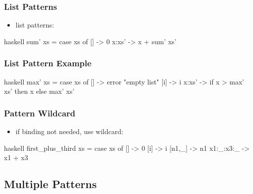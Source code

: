 \documentclass[dvipsnames]{beamer}
\theoremstyle{plain}
\begin{document}
\begin{frame}[fragile]
  \frametitle{List Patterns}

  \begin{itemize}
    \item list patterns:\\
  \end{itemize}

  \pause
  \begin{example}
    \begin{pygments}{haskell}
sum' xs =
    case xs of
      [] -> 0
      x:xs' -> x + sum' xs'
    \end{pygments}
  \end{example}
\end{frame}

\begin{frame}[fragile]
  \frametitle{List Pattern Example}

  \begin{example}
    \pause
    \begin{pygments}{haskell}
max' xs =
    case xs of
      [] -> error "empty list"
      [i] -> i
      x:xs' -> if x > max' xs' then x else max' xs'
    \end{pygments}
  \end{example}
\end{frame}

\begin{frame}[fragile]
  \frametitle{Pattern Wildcard}

  \begin{itemize}
    \item if binding not needed, use wildcard: 
  \end{itemize}

  \begin{example}
    \pause
    \begin{pygments}{haskell}
first_plus_third xs =
    case xs of
      [] -> 0
      [i] -> i
      [n1,_] -> n1
      x1:_:x3:_ -> x1 + x3
    \end{pygments}
  \end{example}
\end{frame}

\subsection{Multiple Patterns}
\end{document}
